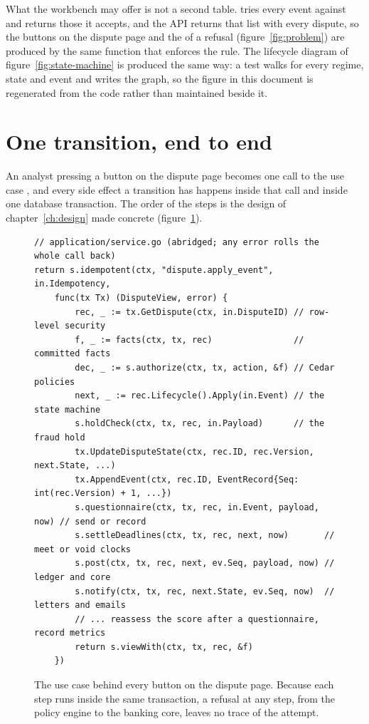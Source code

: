 What the workbench may offer is not a second table.  tries every event against
 and returns those it accepts, and the API returns that list with every dispute, so the buttons on the
dispute page and the  of a refusal (figure~\ref{fig:problem}) are produced by the same function
that enforces the rule. The lifecycle diagram of figure~\ref{fig:state-machine} is produced the same way: a test
walks  for every regime, state and event and writes the graph, so the figure in this document is
regenerated from the code rather than maintained beside it.

\section{One transition, end to end}
\label{sec:impl-transition}

An analyst pressing a button on the dispute page becomes one call to the use case , and every
side effect a transition has happens inside that call and inside one database transaction. The order of the steps
is the design of chapter~\ref{ch:design} made concrete (figure~\ref{fig:apply-event}).

\begin{figure}[htbp]
\begin{lstlisting}
// application/service.go (abridged; any error rolls the whole call back)
return s.idempotent(ctx, "dispute.apply_event", in.Idempotency,
	func(tx Tx) (DisputeView, error) {
		rec, _ := tx.GetDispute(ctx, in.DisputeID) // row-level security
		f, _ := facts(ctx, tx, rec)                // committed facts
		dec, _ := s.authorize(ctx, tx, action, &f) // Cedar policies
		next, _ := rec.Lifecycle().Apply(in.Event) // the state machine
		s.holdCheck(ctx, tx, rec, in.Payload)      // the fraud hold
		tx.UpdateDisputeState(ctx, rec.ID, rec.Version, next.State, ...)
		tx.AppendEvent(ctx, rec.ID, EventRecord{Seq: int(rec.Version) + 1, ...})
		s.questionnaire(ctx, tx, rec, in.Event, payload, now) // send or record
		s.settleDeadlines(ctx, tx, rec, next, now)       // meet or void clocks
		s.post(ctx, tx, rec, next, ev.Seq, payload, now) // ledger and core
		s.notify(ctx, tx, rec, next.State, ev.Seq, now)  // letters and emails
		// ... reassess the score after a questionnaire, record metrics
		return s.viewWith(ctx, tx, rec, &f)
	})
\end{lstlisting}
\caption{The use case behind every button on the dispute page. Because each step runs inside the same
transaction, a refusal at any step, from the policy engine to the banking core, leaves no trace of the attempt.}
\label{fig:apply-event}
\end{figure}

